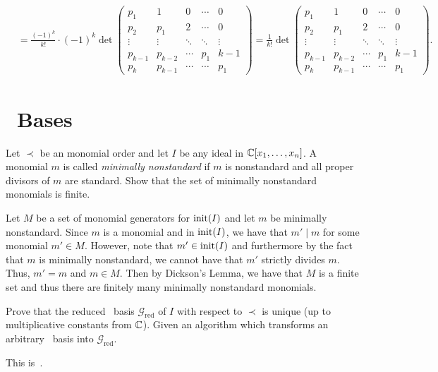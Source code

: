 \documentclass[letterpaper, 11pt, oneside]{book}
\begin{document}
\begin{pf}
\begin{align*}
    &= \frac{(-1)^{k}}{k!} \cdot (-1)^{k}
  \det
  \begin{pmatrix}
    p_{1} & 1 & 0 & \cdots & 0 \\
    p_{2} & p_{1} & 2 & \cdots & 0 \\
    \vdots & \vdots & \ddots & \ddots & \vdots \\
    p_{k - 1} & p_{k - 2} & \cdots & p_{1} & k - 1 \\
    p_{k} & p_{k - 1} & \cdots & \cdots & p_{1}
  \end{pmatrix}
     = \frac{1}{k!}
  \det
  \begin{pmatrix}
    p_{1} & 1 & 0 & \cdots & 0 \\
    p_{2} & p_{1} & 2 & \cdots & 0 \\
    \vdots & \vdots & \ddots & \ddots & \vdots \\
    p_{k - 1} & p_{k - 2} & \cdots & p_{1} & k - 1 \\
    p_{k} & p_{k - 1} & \cdots & \cdots & p_{1}
  \end{pmatrix}.
\end{align*}
\end{pf}

\section*{\Grobner\ Bases}

\begin{exercise}
  Let $\prec$ be an monomial order and let $I$ be any ideal in $\mathbb{C}[x_{1}, \ldots, x_{n}]$.
  A monomial $m$ is called \emph{minimally nonstandard} if $m$ is nonstandard and all proper divisors of $m$ are standard.
  Show that the set of minimally nonstandard monomials is finite.
\end{exercise}
\begin{pf}
  Let $M$ be a set of monomial generators for $\operatorname{init}(I)$ and let $m$ be minimally nonstandard.
  Since $m$ is a monomial and in $\operatorname{init}(I)$, we have that $m' \mid m$ for some monomial $m' \in M$.
  However, note that $m' \in \operatorname{init}(I)$ and furthermore by the fact that $m$ is minimally nonstandard, we cannot have that $m'$ strictly divides $m$.
  Thus, $m' = m$ and $m \in M$.
  Then by Dickson's Lemma, we have that $M$ is a finite set and thus there are finitely many minimally nonstandard monomials.
\end{pf}

\begin{exercise}
  Prove that the reduced \Grobner\ basis $\mathcal{G}_{\text{red}}$ of $I$ with respect to $\prec$ is unique (up to multiplicative constants from $\mathbb{C}$).
  Given an algorithm which transforms an arbitrary \Grobner\ basis into $\mathcal{G}_{\text{red}}$.
\end{exercise}
\begin{pf}
  This is~\cite[Chapter 2, \S 7, Theorem 5]{book:IVA}.
\end{pf}
\end{document}
